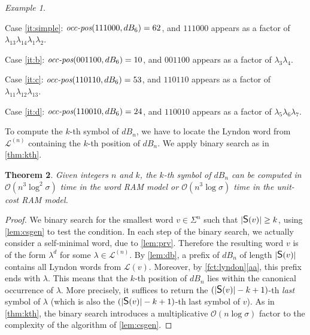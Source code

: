 \documentclass{article}
\newcommand{\mayqed}{}
\newcommand{\Oh}{\mathcal{O}}
\newcommand{\dB}{dB}
\newcommand{\occ}{\mbox{\it occ-pos}}
\renewcommand{\L}{{\mathcal{L}}}
\newcommand{\CS}{\mbox{\large{\sf{S}}}}
\newtheorem{theorem}{Theorem}
\theoremstyle{definition}
\theoremstyle{remark}
\newtheorem{example}[theorem]{Example}
\begin{document}
\begin{example}
\begin{center}
  \end{center}
  \begin{description}
    \item{Case \ref{it:simple}:}
      $\occ(111000,\dB_6)=62$, and $111000$ appears as a factor of $\lambda_{13}\lambda_{14}\lambda_1\lambda_2$.
    \item{Case \ref{it:b}:}
      $\occ(001100,\dB_6)=10$, and $001100$ appears as a factor of $\lambda_3\lambda_4$.
    \item{Case \ref{it:c}:}
      $\occ(110110,\dB_6)=53$, and $110110$ appears as a factor of $\lambda_{11}\lambda_{12}\lambda_{13}$.
    \item{Case \ref{it:d}:}
      $\occ(110010,\dB_6)=24$, and $110010$ appears as a factor of $\lambda_5\lambda_6\lambda_7$.
  \end{description}
\end{example}

\medskip
\noindent
To compute the $k$-th symbol of $\dB_n$, we have to locate the Lyndon word from $\L^{(n)}$ containing
the $k$-th position of $\dB_n$.
We apply binary search as in \cref{thm:kth}.

\begin{theorem}\label{thm:random-access}
  Given integers $n$ and $k$, the $k$-th symbol of $\dB_n$ can be computed
  in $\Oh(n^3\log^2\sigma)$ time in the word RAM model or $\Oh(n^3 \log\sigma)$ time in the unit-cost RAM model.
\end{theorem}
\begin{proof}
  We binary search for the smallest word $v\in \Sigma^n$ 
  such that $|\CS(v)|\ge k$, using \cref{lem:csgen} to test the condition.
  In each step of the binary search, we actually consider a self-minimal word, due to \cref{lem:prv}.
  Therefore the resulting word $v$ is of the form $\lambda^d$ for some $\lambda\in \L^{(n)}$.
  By \cref{lem:db}, a prefix of $\dB_n$ of length $|\CS(v)|$ contains all Lyndon words from $\L(v)$.
  Moreover, by \cref{fct:lyndon}\ref{aa}, this prefix ends with $\lambda$.
This means that the $k$-th position of $\dB_n$ lies within the canonical
  occurrence of $\lambda$. More precisely, it suffices
  to return the $(|\CS(v)|-k+1)$-th \emph{last} symbol of $\lambda$
  (which is also the $(|\CS(v)|-k+1)$-th last symbol of $v$).
  As in \cref{thm:kth}, the binary search introduces a multiplicative
  $\Oh(n\log\sigma)$ factor to the complexity of the algorithm of \cref{lem:csgen}. 
\mayqed\end{proof}
\end{document}
